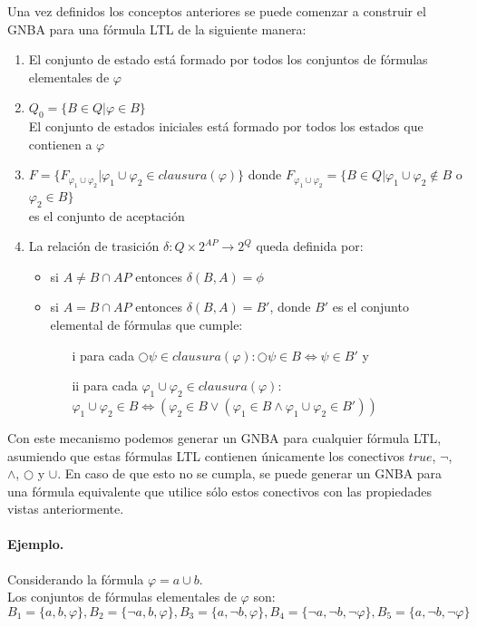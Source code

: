 Una vez definidos los conceptos anteriores se puede comenzar a construir el GNBA para una
fórmula LTL de la siguiente manera:
\begin{enumerate}
\item El conjunto de estado está formado por todos los conjuntos de fórmulas elementales de
 $\varphi$
\item $Q_0 = \{ B \in Q | \varphi \in B \}$ \\
El conjunto de estados iniciales está formado por todos los estados que contienen a $\varphi$
\item $F = \{ F_{\varphi_1 \cup \varphi_2} | \varphi_1 \cup \varphi_2 \in clausura(\varphi) \}$ donde 
$F_{\varphi_1 \cup \varphi_2} = \{ B \in Q | \varphi_1 \cup \varphi_2 \not\in B$ o $ \varphi_2 \in B\}$ \\
es el conjunto de aceptación
\item La relación de trasición $\delta : Q \times 2^{AP} \rightarrow 2^Q$ queda definida por:
\begin{itemize}
\item si $A \neq B \cap AP$ entonces $\delta (B,A) = \phi$
\item si $A = B \cap AP$ entonces $\delta (B,A) = B'$, donde $B'$ es el conjunto elemental de fórmulas
que cumple:
\begin{itemize}
\item[i] para cada $\bigcirc \psi \in clausura(\varphi) : \bigcirc \psi \in B \Leftrightarrow \psi \in B'$ y
\item[ii] para cada $\varphi_1 \cup \varphi_2 \in clausura(\varphi ):$ \\
$\varphi_1 \cup \varphi_2 \in B \Leftrightarrow (\varphi_2 \in B \vee (\varphi_1 \in B \wedge \varphi_1 \cup \varphi_2 \in B'))$
\end{itemize}
\end{itemize}
\end{enumerate}

Con este mecanismo podemos generar un GNBA para cualquier fórmula LTL, asumiendo que estas fórmulas LTL
 contienen únicamente los conectivos $true$, $\lnot$, $\land$, $\bigcirc$ y $\cup$. En caso de que esto
 no se cumpla, se puede generar un GNBA para una fórmula equivalente que utilice sólo estos conectivos
 con las propiedades vistas anteriormente.

\paragraph{Ejemplo.}
Considerando la fórmula $\varphi = a \cup b$.\\
Los conjuntos de fórmulas elementales de $\varphi$ son:
\[
B_1 = \{ a, b, \varphi \}, 
B_2 = \{ \lnot a, b, \varphi \}, 
B_3 = \{ a, \lnot b, \varphi \}, 
B_4 = \{ \lnot a, \lnot b, \lnot \varphi \}, 
B_5 = \{ a, \lnot b, \lnot \varphi \}
\]

